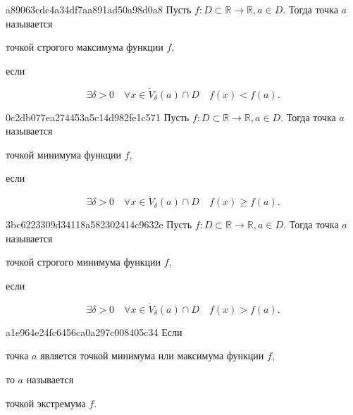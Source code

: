 \begin{note}{a89063cdc4a34df7aa891ad50a98d0a8}
    Пусть \( f : D \subset \mathbb R \to \mathbb R, a \in D \). Тогда точка \( a \) называется \begin{icloze}{2}точкой строгого максимума функции \( f \),\end{icloze} если
    \begin{icloze}{1}\[
        \exists \delta > 0 \quad \forall x \in \dot V_{\delta} (a) \cap D \quad f(x) < f(a).
    \]\end{icloze}
\end{note}

\begin{note}{0c2db077ea274453a5c14d982fe1c571}
    Пусть \( f : D \subset \mathbb R \to \mathbb R, a \in D \). Тогда точка \( a \) называется \begin{icloze}{2}точкой минимума функции \( f \),\end{icloze} если
    \begin{icloze}{1}\[
        \exists \delta > 0 \quad \forall x \in \dot V_{\delta} (a) \cap D \quad f(x) \geqslant f(a).
    \]\end{icloze}
\end{note}

\begin{note}{3bc6223309d34118a582302414c9632e}
    Пусть \( f : D \subset \mathbb R \to \mathbb R, a \in D \). Тогда точка \( a \) называется \begin{icloze}{2}точкой строгого минимума функции \( f \),\end{icloze} если
    \begin{icloze}{1}\[
        \exists \delta > 0 \quad \forall x \in \dot V_{\delta} (a) \cap D \quad f(x) > f(a).
    \]\end{icloze}
\end{note}

\begin{note}{a1e964e24fc6456ca0a297c008405c34}
    Если \begin{icloze}{2}точка \( a \) является точкой минимума или максимума функции \( f \),\end{icloze} то \( a \) называется \begin{icloze}{1}точкой экстремума \( f \).\end{icloze}
\end{note}

